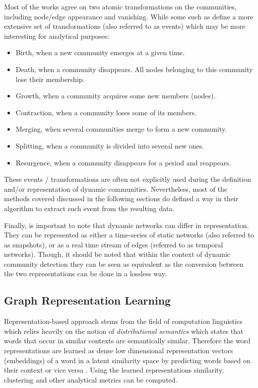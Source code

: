 \documentclass[
acmsmall,
nonacm,
screen,
acmthm]{../../scripts/pandoc/templates/acmart}
\begin{document}
Most of the works agree on two atomic transformations on the
communities, including node/edge appearance and vanishing. While some
such as
\citep[\citet{cazabetUsingDynamicCommunity2012}]{pallaQuantifyingSocialGroup2007, asurEventbasedFrameworkCharacterizing2009}
define a more extensive set of transformations (also referred to as
events) which may be more interesting for analytical purposes:

\begin{itemize}
\item
  Birth, when a new community emerges at a given time.~
\item
  Death, when a community disappears. All nodes belonging to this
  community lose their membership.
\item
  Growth, when a community acquires some new members (nodes).
\item
  Contraction, when a community loses some of its members.
\item
  Merging, when several communities merge to form a new community.
\item
  Splitting, when a community is divided into several new ones.
\item
  Resurgence, when a community disappears for a period and reappears.
\end{itemize}

These events / transformations are often not explicitly used during the
definition and/or representation of dynamic communities. Nevertheless,
most of the methods covered discussed in the following sections do
defined a way in their algorithm to extract such event from the
resulting data.

Finally, is important to note that dynamic networks can differ in
representation. They can be represented as either a time-series of
static networks (also referred to as snapshots), or as a real time
stream of edges (referred to as temporal networks). Though, it should be
noted that within the context of dynamic community detection they can be
seen as equivalent as the conversion between the two representations can
be done in a lossless way.

\hypertarget{graph-representation-learning}{%
\subsection{Graph Representation
Learning}\label{graph-representation-learning}}

Representation-based approach stems from the field of computation
linguistics which relies heavily on the notion of \emph{distributional
semantics} which states that words that occur in similar contexts are
semantically similar. Therefore the word representations are learned as
dense low dimensional representation vectors (embeddings) of a word in a
latent similarity space by predicting words based on their context or
vice versa
\citep{mikolovEfficientEstimationWord2013, penningtonGloveGlobalVectors2014}.
Using the learned representations similarity, clustering and other
analytical metrics can be computed.
\end{document}

